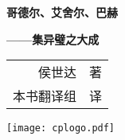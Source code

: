 
\cleardoublepage

\vspace*{3\baselineskip}

\begingroup
\centering

{\huge\bfseries 哥德尔、艾舍尔、巴赫}

\vspace{2\baselineskip}

\hfill{\Large\bfseries\sffamily ——集异璧之大成\qquad\null}

\vspace{3\baselineskip}

\begin{tabular}{>{\kaishu}r@{\enskip}>{\small}l}
{\small\upshape\sffamily〔美〕}侯世达 & 著 \\
本书翻译组                      & 译 \\
\end{tabular}

\vfill

\texttt{[image: cplogo.pdf]}

\endgroup
